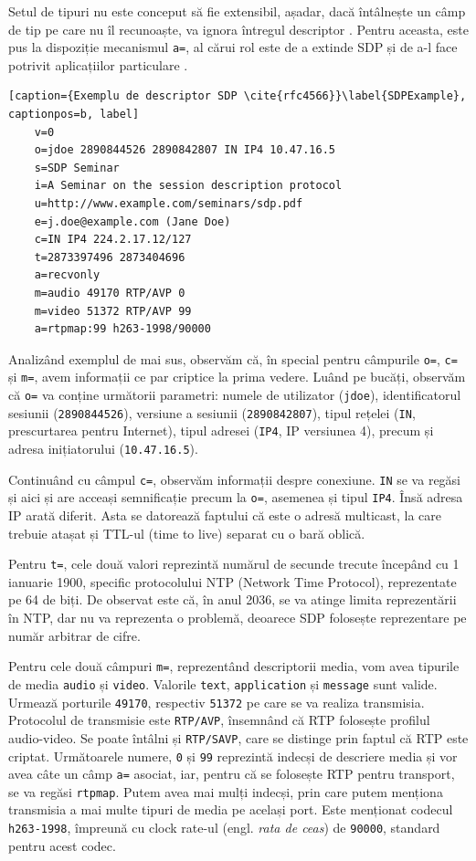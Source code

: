 \indent \par Setul de tipuri nu este conceput să fie extensibil, așadar, dacă întâlnește un câmp de tip pe care nu îl recunoaște, va ignora întregul descriptor \cite{rfc4566}. Pentru aceasta, este pus la dispoziție mecanismul \texttt{a=}, al cărui rol este de a extinde SDP și de a-l face potrivit aplicațiilor particulare \cite{rfc4566}.
\begin{lstlisting}[caption={Exemplu de descriptor SDP \cite{rfc4566}}\label{SDPExample}, captionpos=b, label]
    v=0
    o=jdoe 2890844526 2890842807 IN IP4 10.47.16.5
    s=SDP Seminar
    i=A Seminar on the session description protocol
    u=http://www.example.com/seminars/sdp.pdf
    e=j.doe@example.com (Jane Doe)
    c=IN IP4 224.2.17.12/127
    t=2873397496 2873404696
    a=recvonly
    m=audio 49170 RTP/AVP 0
    m=video 51372 RTP/AVP 99
    a=rtpmap:99 h263-1998/90000
\end{lstlisting}
\indent \par Analizând exemplul de mai sus, observăm că, în special pentru câmpurile \texttt{o=}, \texttt{c=} și \texttt{m=}, avem informații ce par criptice la prima vedere. Luând pe bucăți, observăm că \texttt{o=} va conține următorii parametri: numele de utilizator (\texttt{jdoe}), identificatorul sesiunii (\texttt{2890844526}), versiune a sesiunii (\texttt{2890842807}), tipul rețelei (\texttt{IN}, prescurtarea pentru Internet), tipul adresei (\texttt{IP4}, IP versiunea 4), precum și adresa inițiatorului (\texttt{10.47.16.5}).
\indent \par Continuând cu câmpul \texttt{c=}, observăm informații despre conexiune. \texttt{IN} se va regăsi și aici și are acceași semnificație precum la \texttt{o=}, asemenea și tipul \texttt{IP4}. Însă adresa IP arată diferit. Asta se datorează faptului că este o adresă multicast, la care trebuie atașat și TTL-ul (time to live) separat cu o bară oblică.
\indent \par Pentru \texttt{t=}, cele două valori reprezintă numărul de secunde trecute începând cu 1 ianuarie 1900, specific protocolului NTP (Network Time Protocol), reprezentate pe 64 de biți. De observat este că, în anul 2036, se va atinge limita reprezentării în NTP, dar nu va reprezenta o problemă, deoarece SDP folosește reprezentare pe număr arbitrar de cifre.
\indent \par Pentru cele două câmpuri \texttt{m=}, reprezentând descriptorii media, vom avea tipurile de media \texttt{audio} și \texttt{video}. Valorile \texttt{text}, \texttt{application} și \texttt{message} sunt valide. Urmează porturile \texttt{49170}, respectiv \texttt{51372} pe care se va realiza transmisia. Protocolul de transmisie este \texttt{RTP/AVP}, însemnând că RTP folosește profilul audio-video. Se poate întâlni și \texttt{RTP/SAVP}, care se distinge prin faptul că RTP este criptat. Următoarele numere, \texttt{0} și \texttt{99} reprezintă indecși de descriere media și vor avea câte un câmp \texttt{a=} asociat, iar, pentru că se folosește RTP pentru transport, se va regăsi \texttt{rtpmap}. Putem avea mai mulți indecși, prin care putem menționa transmisia a mai multe tipuri de media pe același port. Este menționat codecul \texttt{h263-1998}, împreună cu clock rate-ul (engl. \textit{rata de ceas}) de \texttt{90000}, standard pentru acest codec.

